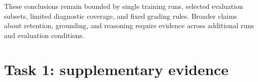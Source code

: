 \documentclass{article}
\begin{document}
These conclusions remain bounded by single training runs, selected evaluation subsets, limited diagnostic coverage, and fixed grading rules. Broader claims about retention, grounding, and reasoning require evidence across additional runs and evaluation conditions.

\clearpage  %
\nocite{yao2023tot,lightman2023verify}



\appendix
\section{Task 1: supplementary evidence}
\label{app:t1}

\begin{table}[ht]
\centering\small

\caption{Task 1 training data, shared optimization settings, and method-specific hyperparameters. Adapter ranks and scales maintain \(\alpha/r=2\), while OPLoRA protects the top 128 singular directions.}
\label{tab:a1-config}
\end{table}

\begin{table}[ht]
\centering\small
\resizebox{\linewidth}{!}{}
\caption{Additional benchmark and evaluation checks. Columns report GSM8K strict-match accuracy, truncation, extraction, and response length, unnormalized HellaSwag and ARC-Easy accuracy, and maximum FP32 logit differences between merged and unmerged adapters.}
\label{tab:a1-eval}
\end{table}

\begin{table}[ht]
\centering\small

\caption{GSM8K question-level changes from baseline across 1,319 questions. Wrong-to-right counts corrected answers, right-to-wrong counts newly incorrect answers, and net gives their difference.}
\label{tab:a1-trans}
\end{table}
\end{document}

